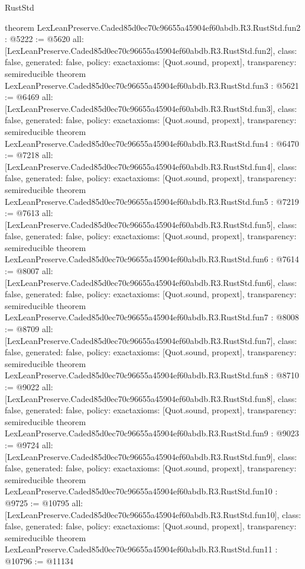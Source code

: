 \begin{lexlean}{RustStd}
\begin{coremodule}
{}
theorem LexLeanPreserve.Caded85d0ec70c96655a45904ef60abdb.R3.RustStd.fun2 : @5222 := @5620 {
  all: [LexLeanPreserve.Caded85d0ec70c96655a45904ef60abdb.R3.RustStd.fun2],
  class: false,
  generated: false,
  policy: exact{axioms: [Quot.sound, propext]},
  transparency: semireducible
}
theorem LexLeanPreserve.Caded85d0ec70c96655a45904ef60abdb.R3.RustStd.fun3 : @5621 := @6469 {
  all: [LexLeanPreserve.Caded85d0ec70c96655a45904ef60abdb.R3.RustStd.fun3],
  class: false,
  generated: false,
  policy: exact{axioms: [Quot.sound, propext]},
  transparency: semireducible
}
theorem LexLeanPreserve.Caded85d0ec70c96655a45904ef60abdb.R3.RustStd.fun4 : @6470 := @7218 {
  all: [LexLeanPreserve.Caded85d0ec70c96655a45904ef60abdb.R3.RustStd.fun4],
  class: false,
  generated: false,
  policy: exact{axioms: [Quot.sound, propext]},
  transparency: semireducible
}
theorem LexLeanPreserve.Caded85d0ec70c96655a45904ef60abdb.R3.RustStd.fun5 : @7219 := @7613 {
  all: [LexLeanPreserve.Caded85d0ec70c96655a45904ef60abdb.R3.RustStd.fun5],
  class: false,
  generated: false,
  policy: exact{axioms: [Quot.sound, propext]},
  transparency: semireducible
}
theorem LexLeanPreserve.Caded85d0ec70c96655a45904ef60abdb.R3.RustStd.fun6 : @7614 := @8007 {
  all: [LexLeanPreserve.Caded85d0ec70c96655a45904ef60abdb.R3.RustStd.fun6],
  class: false,
  generated: false,
  policy: exact{axioms: [Quot.sound, propext]},
  transparency: semireducible
}
theorem LexLeanPreserve.Caded85d0ec70c96655a45904ef60abdb.R3.RustStd.fun7 : @8008 := @8709 {
  all: [LexLeanPreserve.Caded85d0ec70c96655a45904ef60abdb.R3.RustStd.fun7],
  class: false,
  generated: false,
  policy: exact{axioms: [Quot.sound, propext]},
  transparency: semireducible
}
theorem LexLeanPreserve.Caded85d0ec70c96655a45904ef60abdb.R3.RustStd.fun8 : @8710 := @9022 {
  all: [LexLeanPreserve.Caded85d0ec70c96655a45904ef60abdb.R3.RustStd.fun8],
  class: false,
  generated: false,
  policy: exact{axioms: [Quot.sound, propext]},
  transparency: semireducible
}
theorem LexLeanPreserve.Caded85d0ec70c96655a45904ef60abdb.R3.RustStd.fun9 : @9023 := @9724 {
  all: [LexLeanPreserve.Caded85d0ec70c96655a45904ef60abdb.R3.RustStd.fun9],
  class: false,
  generated: false,
  policy: exact{axioms: [Quot.sound, propext]},
  transparency: semireducible
}
theorem LexLeanPreserve.Caded85d0ec70c96655a45904ef60abdb.R3.RustStd.fun10 : @9725 := @10795 {
  all: [LexLeanPreserve.Caded85d0ec70c96655a45904ef60abdb.R3.RustStd.fun10],
  class: false,
  generated: false,
  policy: exact{axioms: [Quot.sound, propext]},
  transparency: semireducible
}
theorem LexLeanPreserve.Caded85d0ec70c96655a45904ef60abdb.R3.RustStd.fun11 : @10796 := @11134 {
}
\end{coremodule}
\end{lexlean}
